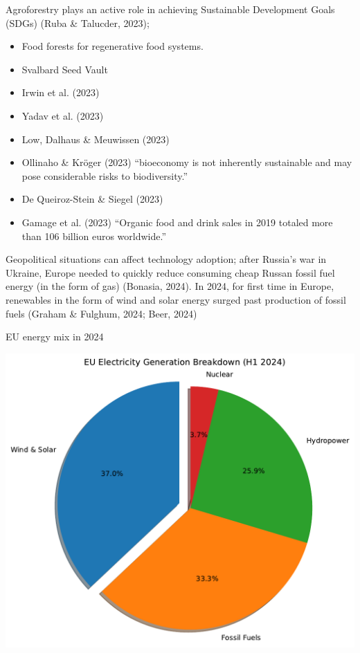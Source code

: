 \documentclass[
  letterpaper,
  DIV=11,
  numbers=noendperiod]{scrartcl}
\providecommand{\tightlist}{%
  \setlength{\itemsep}{0pt}\setlength{\parskip}{0pt}}\usepackage{longtable,booktabs,array}
\begin{document}
Agroforestry plays an active role in achieving Sustainable Development
Goals (SDGs) (Ruba \& Talucder, 2023);

\begin{itemize}
\tightlist
\item
  Food forests for regenerative food systems.
\item
  Svalbard Seed Vault
\item
  Irwin et al. (2023)
\item
  Yadav et al. (2023)
\item
  Low, Dalhaus \& Meuwissen (2023)
\item
  Ollinaho \& Kröger (2023) ``bioeconomy is not inherently sustainable
  and may pose considerable risks to biodiversity.''
\item
  De Queiroz-Stein \& Siegel (2023)
\item
  Gamage et al. (2023) ``Organic food and drink sales in 2019 totaled
  more than 106 billion euros worldwide.''
\end{itemize}

Geopolitical situations can affect technology adoption; after Russia's
war in Ukraine, Europe needed to quickly reduce consuming cheap Russan
fossil fuel energy (in the form of gas) (Bonasia, 2024). In 2024, for
first time in Europe, renewables in the form of wind and solar energy
surged past production of fossil fuels (Graham \& Fulghum, 2024; Beer,
2024)

EU energy mix in 2024

\includegraphics{_thesis_files/figure-pdf/cell-19-output-1.pdf}
\end{document}
